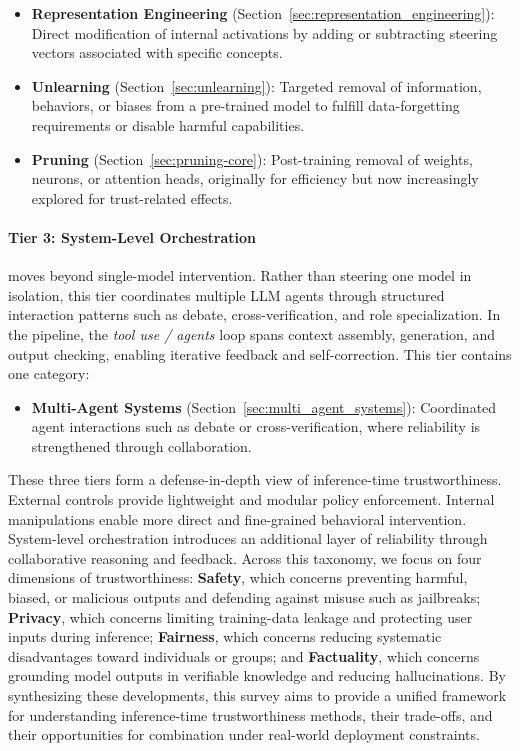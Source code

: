 \begin{itemize}
\item \textbf{Representation Engineering} (Section~\ref{sec:representation_engineering}): Direct modification of internal activations by adding or subtracting steering vectors associated with specific concepts.
\item \textbf{Unlearning} (Section~\ref{sec:unlearning}): Targeted removal of information, behaviors, or biases from a pre-trained model to fulfill data-forgetting requirements or disable harmful capabilities.
\item \textbf{Pruning} (Section~\ref{sec:pruning-core}): Post-training removal of weights, neurons, or attention heads, originally for efficiency but now increasingly explored for trust-related effects.
\end{itemize}

\paragraph{Tier 3: System-Level Orchestration} moves beyond single-model intervention. Rather than steering one model in isolation, this tier coordinates multiple LLM agents through structured interaction patterns such as debate, cross-verification, and role specialization. In the pipeline, the \emph{tool use / agents} loop spans context assembly, generation, and output checking, enabling iterative feedback and self-correction. This tier contains one category:

\begin{itemize}
\item \textbf{Multi-Agent Systems} (Section~\ref{sec:multi_agent_systems}): Coordinated agent interactions such as debate or cross-verification, where reliability is strengthened through collaboration.
\end{itemize}

These three tiers form a defense-in-depth view of inference-time trustworthiness. External controls provide lightweight and modular policy enforcement. Internal manipulations enable more direct and fine-grained behavioral intervention. System-level orchestration introduces an additional layer of reliability through collaborative reasoning and feedback. Across this taxonomy, we focus on four dimensions of trustworthiness: \textbf{Safety}, which concerns preventing harmful, biased, or malicious outputs and defending against misuse such as jailbreaks; \textbf{Privacy}, which concerns limiting training-data leakage and protecting user inputs during inference; \textbf{Fairness}, which concerns reducing systematic disadvantages toward individuals or groups; and \textbf{Factuality}, which concerns grounding model outputs in verifiable knowledge and reducing hallucinations. By synthesizing these developments, this survey aims to provide a unified framework for understanding inference-time trustworthiness methods, their trade-offs, and their opportunities for combination under real-world deployment constraints.

